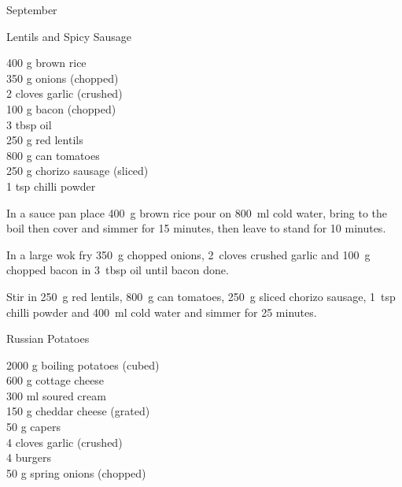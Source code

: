 \begin{menu}{September}
    \begin{recipe}{2}{Lentils and Spicy Sausage}%
		\begin{ingredients}
		400 g brown rice  \\
	350 g onions (chopped) \\
	2 cloves garlic (crushed) \\
	100 g bacon (chopped) \\
	3 tbsp oil  \\
	250 g red lentils  \\
	800 g can tomatoes  \\
	250 g chorizo sausage (sliced) \\
	1 tsp chilli powder  \\
	
		\end{ingredients}
	
	
    \begin{instructions}
    \item 
    In a
    sauce pan
    place
    400~g  brown rice
    pour on
    800~ml  cold water,
    bring to the boil then cover and simmer for 15 minutes,
    then leave to stand for 10 minutes.
  \item 
        In a large wok fry
        350~g chopped onions,
        2~cloves crushed garlic
        and
        100~g chopped bacon
        in
        3~tbsp  oil
        until bacon done.
      \item 
        Stir in
        250~g  red lentils,
        800~g  can tomatoes,
        250~g sliced chorizo sausage,
        1~tsp  chilli powder
        and
        400~ml  cold water
        and simmer for 25 minutes.
      
    \end{instructions}
    \end{recipe}%
  
    \begin{recipe}{2}{Russian Potatoes}%
		\begin{ingredients}
		2000 g boiling potatoes (cubed) \\
	600 g cottage cheese  \\
	300 ml soured cream  \\
	150 g cheddar cheese (grated) \\
	50 g capers  \\
	4 cloves garlic (crushed) \\
	4  burgers  \\
	50 g spring onions (chopped) \\
	

\end{ingredients}
\end{recipe}
\end{menu}
